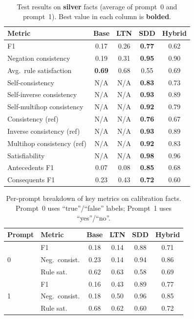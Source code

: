 \documentclass[11pt,a4paper]{article}
\begin{document}
\begin{table}[H]
\centering
\caption{Test results on \textbf{silver} facts (average of prompt~0
  and prompt~1).  Best value in each column is \textbf{bolded}.}
\label{tab:main-silver}
\small
\begin{tabular}{@{}lcccc@{}}
\toprule
\textbf{Metric} & \textbf{Base} & \textbf{LTN} & \textbf{SDD} & \textbf{Hybrid} \\
\midrule
F1                          & 0.17  & 0.26  & \textbf{0.77} & 0.62 \\
Negation consistency        & 0.19  & 0.31  & \textbf{0.95} & 0.90 \\
Avg.\ rule satisfaction     & \textbf{0.69}  & 0.68  & 0.55 & 0.69 \\
\midrule
Self-consistency            & N/A   & N/A   & \textbf{0.83} & 0.73 \\
Self-inverse consistency    & N/A   & N/A   & \textbf{0.93} & 0.89 \\
Self-multihop consistency   & N/A   & N/A   & \textbf{0.92} & 0.79 \\
Consistency (ref)           & N/A   & N/A   & \textbf{0.76} & 0.67 \\
Inverse consistency (ref)   & N/A   & N/A   & \textbf{0.93} & 0.89 \\
Multihop consistency (ref)  & N/A   & N/A   & \textbf{0.92} & 0.83 \\
Satisfiability              & N/A   & N/A   & \textbf{0.98} & 0.96 \\
\midrule
Antecedents F1              & 0.07  & 0.08  & \textbf{0.85} & 0.68 \\
Consequents F1              & 0.23  & 0.43  & \textbf{0.72} & 0.60 \\
\bottomrule
\end{tabular}
\end{table}

\begin{table}[H]
\centering
\caption{Per-prompt breakdown of key metrics on calibration facts.
  Prompt~0 uses ``true''/``false'' labels; Prompt~1 uses ``yes''/``no''.}
\label{tab:per-prompt}
\small
\begin{tabular}{@{}ll cccc@{}}
\toprule
\textbf{Prompt} & \textbf{Metric} & \textbf{Base} & \textbf{LTN} & \textbf{SDD} & \textbf{Hybrid} \\
\midrule
\multirow{3}{*}{0}
  & F1              & 0.18 & 0.14 & 0.88 & 0.71 \\
  & Neg.\ consist.  & 0.23 & 0.14 & 0.94 & 0.86 \\
  & Rule sat.       & 0.62 & 0.63 & 0.58 & 0.69 \\
\midrule
\multirow{3}{*}{1}
  & F1              & 0.16 & 0.43 & 0.89 & 0.77 \\
  & Neg.\ consist.  & 0.18 & 0.50 & 0.96 & 0.85 \\
  & Rule sat.       & 0.68 & 0.62 & 0.60 & 0.72 \\
\bottomrule
\end{tabular}
\end{table}
\end{document}
